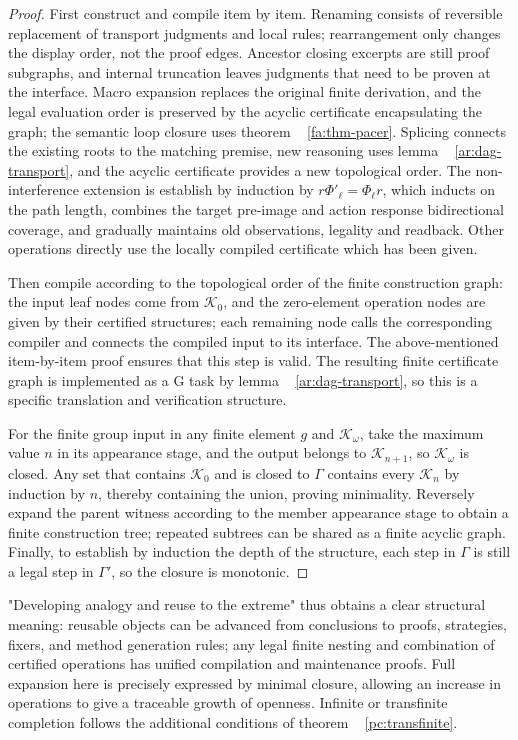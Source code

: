 \documentclass[11pt,a4paper]{article}
\theoremstyle{plain}
\theoremstyle{definition}
\theoremstyle{remark}
\begin{document}
\begin{CJK*}
\begin{proof}
First construct and compile item by item. Renaming consists of reversible replacement of transport judgments and local rules; rearrangement only changes the display order, not the proof edges. Ancestor closing excerpts are still proof subgraphs, and internal truncation leaves judgments that need to be proven at the interface. Macro expansion replaces the original finite derivation, and the legal evaluation order is preserved by the acyclic certificate encapsulating the graph; the semantic loop closure uses theorem ~ \ref{fa:thm-pacer}. Splicing connects the existing roots to the matching premise, new reasoning uses lemma ~ \ref{ar:dag-transport}, and the acyclic certificate provides a new topological order. The non-interference extension is establish by induction by $r\Phi'_\ell=\Phi_\ell r$, which inducts on the path length, combines the target pre-image and action response bidirectional coverage, and gradually maintains old observations, legality and readback. Other operations directly use the locally compiled certificate which has been given.

Then compile according to the topological order of the finite construction graph: the input leaf nodes come from $\mathcal K_0$, and the zero-element operation nodes are given by their certified structures; each remaining node calls the corresponding compiler and connects the compiled input to its interface. The above-mentioned item-by-item proof ensures that this step is valid. The resulting finite certificate graph is implemented as a G task by lemma ~ \ref{ar:dag-transport}, so this is a specific translation and verification structure.

For the finite group input in any finite element $g$ and $\mathcal K_\omega$, take the maximum value $n$ in its appearance stage, and the output belongs to $\mathcal K_{n+1}$, so $\mathcal K_\omega$ is closed. Any set that contains $\mathcal K_0$ and is closed to $\Gamma$ contains every $\mathcal K_n$ by induction by $n$, thereby containing the union, proving minimality. Reversely expand the parent witness according to the member appearance stage to obtain a finite construction tree; repeated subtrees can be shared as a finite acyclic graph. Finally, to establish by induction the depth of the structure, each step in $\Gamma$ is still a legal step in $\Gamma'$, so the closure is monotonic.\end{proof}


"Developing analogy and reuse to the extreme" thus obtains a clear structural meaning: reusable objects can be advanced from conclusions to proofs, strategies, fixers, and method generation rules; any legal finite nesting and combination of certified operations has unified compilation and maintenance proofs. Full expansion here is precisely expressed by minimal closure, allowing an increase in operations to give a traceable growth of openness. Infinite or transfinite completion follows the additional conditions of theorem ~ \ref{pc:transfinite}.


\end{CJK*}
\end{document}
